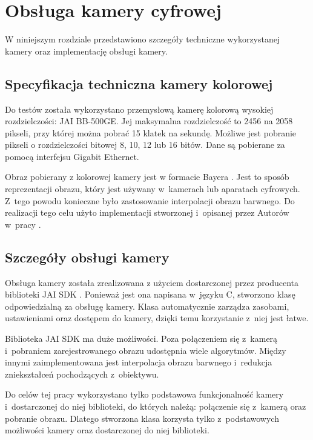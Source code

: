 \chapter{Obsługa kamery cyfrowej}
\label{cha:obslugakamery}

W niniejszym rozdziale przedstawiono szczegóły techniczne wykorzystanej kamery oraz implementację obsługi kamery.

\section{Specyfikacja techniczna kamery kolorowej}
\label{sec:specyfikacjaKamery}

Do testów została wykorzystano przemysłową kamerę kolorową wysokiej rozdzielczości: JAI BB-500GE. Jej maksymalna rozdzielczość to 2456 na 2058 pikseli, przy której można pobrać 15 klatek na sekundę. Możliwe jest pobranie pikseli o rozdzielczości bitowej 8, 10, 12 lub 16 bitów. Dane są pobierane za pomocą interfejsu Gigabit Ethernet. 

Obraz pobierany z kolorowej kamery jest w formacie Bayera \cite{Bayer}. Jest to sposób reprezentacji obrazu, który jest używany w~kamerach lub aparatach cyfrowych. Z~tego powodu konieczne było zastosowanie interpolacji obrazu barwnego. Do realizacji tego celu użyto implementacji stworzonej i~opisanej przez Autorów w~pracy \cite{BFIOCL}.

\section{Szczegóły obsługi kamery}
\label{sec:szczegolyObslugiKamery}

Obsługa kamery została zrealizowana z użyciem dostarczonej przez producenta biblioteki JAI SDK \cite{JAISDK}. Ponieważ jest ona napisana w~języku C, stworzono klasę odpowiedzialną za obsługę kamery. Klasa automatycznie zarządza zasobami, ustawieniami oraz dostępem do kamery, dzięki temu korzystanie z~niej jest łatwe.

Biblioteka JAI SDK ma duże możliwości. Poza połączeniem się z~kamerą i~pobraniem zarejestrowanego obrazu udostępnia wiele algorytmów. Między innymi zaimplementowana jest interpolacja obrazu barwnego i~redukcja zniekształceń pochodzących z~obiektywu.

Do celów tej pracy wykorzystano tylko podstawowa funkcjonalność kamery i~dostarczonej do niej biblioteki, do których należą: połączenie się z~kamerą oraz pobranie obrazu. Dlatego stworzona klasa korzysta tylko z~podstawowych możliwości kamery oraz dostarczonej do niej biblioteki.

